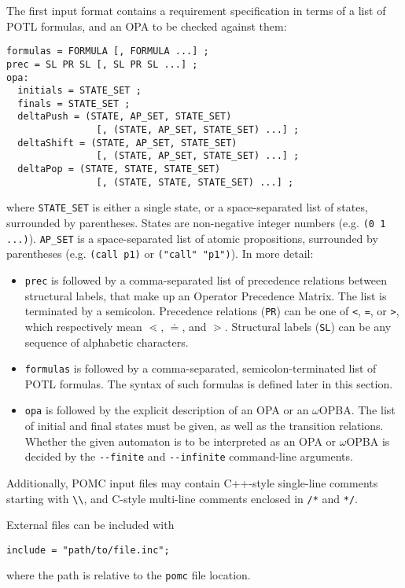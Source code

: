 \documentclass[9pt,a4paper]{article}
\begin{document}
The first input format contains a requirement specification in terms of a list of
POTL formulas, and an OPA to be checked against them:
\begin{verbatim}
formulas = FORMULA [, FORMULA ...] ;
prec = SL PR SL [, SL PR SL ...] ;
opa:
  initials = STATE_SET ;
  finals = STATE_SET ;
  deltaPush = (STATE, AP_SET, STATE_SET)
                [, (STATE, AP_SET, STATE_SET) ...] ;
  deltaShift = (STATE, AP_SET, STATE_SET)
                [, (STATE, AP_SET, STATE_SET) ...] ;
  deltaPop = (STATE, STATE, STATE_SET)
                [, (STATE, STATE, STATE_SET) ...] ;
\end{verbatim}
where \texttt{STATE\_SET} is either a single state, or a space-separated list of states,
surrounded by parentheses.
States are non-negative integer numbers (e.g. \texttt{(0 1 ...)}).
\texttt{AP\_SET} is a space-separated list of atomic propositions, surrounded by parentheses
(e.g. \texttt{(call p1)} or \texttt{("call" "p1")}).
In more detail:
\begin{itemize}
\item \texttt{prec}
  is followed by a comma-separated list of precedence relations between structural labels,
  that make up an Operator Precedence Matrix.
  The list is terminated by a semicolon.
  Precedence relations (\texttt{PR}) can be one of \texttt{<}, \texttt{=}, or \texttt{>},
  which respectively mean $\lessdot$, $\doteq$, and $\gtrdot$.
  Structural labels (\texttt{SL}) can be any sequence of alphabetic characters.
\item \texttt{formulas}
  is followed by a comma-separated, semicolon-terminated list of POTL formulas.
  The syntax of such formulas is defined later in this section.
\item \texttt{opa}
  is followed by the explicit description of an OPA or an $\omega$OPBA.
  The list of initial and final states must be given, as well as the transition relations.
  Whether the given automaton is to be interpreted as an OPA or $\omega$OPBA is decided
  by the \verb|--finite| and \verb|--infinite| command-line arguments.
\end{itemize}

Additionally, POMC input files may contain C++-style single-line comments
starting with \verb|\\|, and C-style multi-line comments enclosed in
\verb|/*| and \verb|*/|.

External files can be included with
\begin{verbatim}
include = "path/to/file.inc";
\end{verbatim}
where the path is relative to the \texttt{pomc} file location.
\end{document}
